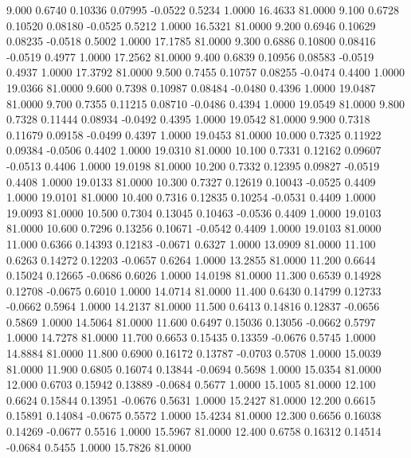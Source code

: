    9.000   0.6740   0.10336   0.07995  -0.0522   0.5234   1.0000  16.4633  81.0000
   9.100   0.6728   0.10520   0.08180  -0.0525   0.5212   1.0000  16.5321  81.0000
   9.200   0.6946   0.10629   0.08235  -0.0518   0.5002   1.0000  17.1785  81.0000
   9.300   0.6886   0.10800   0.08416  -0.0519   0.4977   1.0000  17.2562  81.0000
   9.400   0.6839   0.10956   0.08583  -0.0519   0.4937   1.0000  17.3792  81.0000
   9.500   0.7455   0.10757   0.08255  -0.0474   0.4400   1.0000  19.0366  81.0000
   9.600   0.7398   0.10987   0.08484  -0.0480   0.4396   1.0000  19.0487  81.0000
   9.700   0.7355   0.11215   0.08710  -0.0486   0.4394   1.0000  19.0549  81.0000
   9.800   0.7328   0.11444   0.08934  -0.0492   0.4395   1.0000  19.0542  81.0000
   9.900   0.7318   0.11679   0.09158  -0.0499   0.4397   1.0000  19.0453  81.0000
  10.000   0.7325   0.11922   0.09384  -0.0506   0.4402   1.0000  19.0310  81.0000
  10.100   0.7331   0.12162   0.09607  -0.0513   0.4406   1.0000  19.0198  81.0000
  10.200   0.7332   0.12395   0.09827  -0.0519   0.4408   1.0000  19.0133  81.0000
  10.300   0.7327   0.12619   0.10043  -0.0525   0.4409   1.0000  19.0101  81.0000
  10.400   0.7316   0.12835   0.10254  -0.0531   0.4409   1.0000  19.0093  81.0000
  10.500   0.7304   0.13045   0.10463  -0.0536   0.4409   1.0000  19.0103  81.0000
  10.600   0.7296   0.13256   0.10671  -0.0542   0.4409   1.0000  19.0103  81.0000
  11.000   0.6366   0.14393   0.12183  -0.0671   0.6327   1.0000  13.0909  81.0000
  11.100   0.6263   0.14272   0.12203  -0.0657   0.6264   1.0000  13.2855  81.0000
  11.200   0.6644   0.15024   0.12665  -0.0686   0.6026   1.0000  14.0198  81.0000
  11.300   0.6539   0.14928   0.12708  -0.0675   0.6010   1.0000  14.0714  81.0000
  11.400   0.6430   0.14799   0.12733  -0.0662   0.5964   1.0000  14.2137  81.0000
  11.500   0.6413   0.14816   0.12837  -0.0656   0.5869   1.0000  14.5064  81.0000
  11.600   0.6497   0.15036   0.13056  -0.0662   0.5797   1.0000  14.7278  81.0000
  11.700   0.6653   0.15435   0.13359  -0.0676   0.5745   1.0000  14.8884  81.0000
  11.800   0.6900   0.16172   0.13787  -0.0703   0.5708   1.0000  15.0039  81.0000
  11.900   0.6805   0.16074   0.13844  -0.0694   0.5698   1.0000  15.0354  81.0000
  12.000   0.6703   0.15942   0.13889  -0.0684   0.5677   1.0000  15.1005  81.0000
  12.100   0.6624   0.15844   0.13951  -0.0676   0.5631   1.0000  15.2427  81.0000
  12.200   0.6615   0.15891   0.14084  -0.0675   0.5572   1.0000  15.4234  81.0000
  12.300   0.6656   0.16038   0.14269  -0.0677   0.5516   1.0000  15.5967  81.0000
  12.400   0.6758   0.16312   0.14514  -0.0684   0.5455   1.0000  15.7826  81.0000
